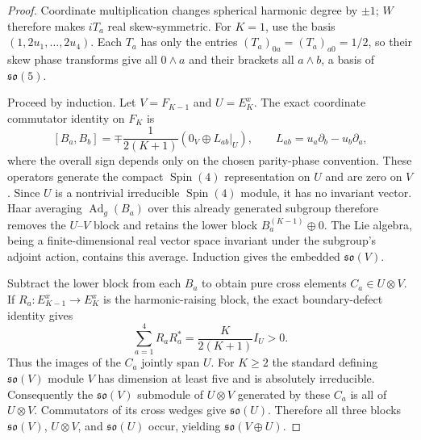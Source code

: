 \documentclass[12pt,a4paper]{article}
\begin{document}
\begin{proof}
Coordinate multiplication changes spherical harmonic degree by $\pm1$;
$W$ therefore makes $iT_a$ real skew-symmetric. For $K=1$, use the
basis $(1,2u_1,\ldots,2u_4)$. Each $T_a$ has only the entries
$(T_a)_{0a}=(T_a)_{a0}=1/2$, so their skew phase transforms give all
$0\wedge a$ and their brackets all $a\wedge b$, a basis of
$\mathfrak{so}(5)$.

Proceed by induction. Let $V=F_{K-1}$ and $U=E_K^x$.
The exact coordinate commutator identity on $F_K$ is
\[
 [B_a,B_b]=\mp\frac{1}{2(K+1)}
  (0_V\oplus L_{ab}|_U),\qquad
 L_{ab}=u_a\partial_b-u_b\partial_a,
\]
where the overall sign depends only on the chosen parity-phase convention.
These operators generate the compact $\operatorname{Spin}(4)$ representation
on $U$ and are zero on $V$. Since $U$ is a nontrivial irreducible
$\operatorname{Spin}(4)$ module, it has no invariant vector.
Haar averaging $\operatorname{Ad}_g(B_a)$ over this already generated
subgroup therefore removes the $U$--$V$ block and retains the lower block
$B_a^{(K-1)}\oplus0$. The Lie algebra, being a finite-dimensional real
vector space invariant under the subgroup's adjoint action, contains this
average. Induction gives the embedded $\mathfrak{so}(V)$.

Subtract the lower block from each $B_a$ to obtain pure cross elements
$C_a\in U\otimes V$. If $R_a:E_{K-1}^x\to E_K^x$ is the harmonic-raising
block, the exact boundary-defect identity gives
\[
 \sum_{a=1}^{4}R_aR_a^*=\frac{K}{2(K+1)}I_U>0.
\]
Thus the images of the $C_a$ jointly span $U$. For $K\ge2$ the
standard defining $\mathfrak{so}(V)$ module $V$ has dimension at least
five and is absolutely irreducible. Consequently the
$\mathfrak{so}(V)$ submodule of $U\otimes V$ generated by these $C_a$
is all of $U\otimes V$. Commutators of its cross wedges give
$\mathfrak{so}(U)$. Therefore all three blocks
$\mathfrak{so}(V)$, $U\otimes V$, and $\mathfrak{so}(U)$ occur, yielding
$\mathfrak{so}(V\oplus U)$.\end{proof}
\end{document}
